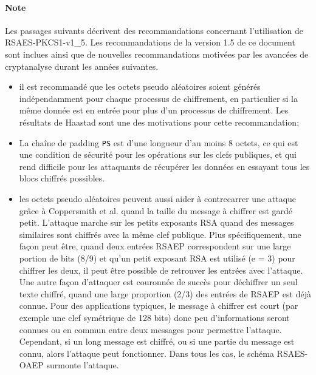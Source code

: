 \paragraph{Note}  Les passages suivants décrivent des recommandations concernant l'utilisation de RSAES-PKCS1-v1\_5. Les recommandations de la version 1.5 de ce document sont inclues ainsi que de nouvelles recommandations motivées par les avancées de cryptanalyse durant les années suivantes.
\begin{itemize}
	\item il est recommandé que les octets pseudo aléatoires soient générés indépendamment pour chaque processus de chiffrement, en particulier si la même donnée est en entrée pour plus d'un processus de chiffrement. Les résultats de Haastad sont une des motivations pour cette recommandation;
	\item La chaîne de padding \texttt{PS} est d'une longueur d'au moins 8 octets, ce qui est une condition de sécurité pour les opérations sur les clefs publiques, et qui rend difficile pour les attaquants de récupérer les données en essayant tous les blocs chiffrés possibles.
	\item les octets pseudo aléatoires peuvent aussi aider à contrecarrer une attaque grâce à Coppersmith et al. quand la taille du message à chiffrer est gardé petit. L'attaque marche sur les petits exposants RSA quand des messages similaires sont chiffrés avec la même clef publique. Plus spécifiquement, une façon peut être, quand deux entrées RSAEP correspondent sur une large portion de bits (8/9) et qu'un petit exposant RSA est utilisé (e = 3) pour chiffrer les deux, il peut être possible de retrouver les entrées avec l'attaque. Une autre façon d'attaquer est couronnée de succès pour déchiffrer un seul texte chiffré, quand une large proportion (2/3) des entrées de RSAEP est déjà connue. Pour des applications typiques, le message à chiffrer est court (par exemple une clef symétrique de 128 bits) donc peu d'informations seront connues ou en commun entre deux messages pour permettre l'attaque. Cependant, si un long message est chiffré, ou si une partie du message est connu, alors l'attaque peut fonctionner. Dans tous les cas, le schéma  RSAES-OAEP surmonte l'attaque.\\
\end{itemize}

